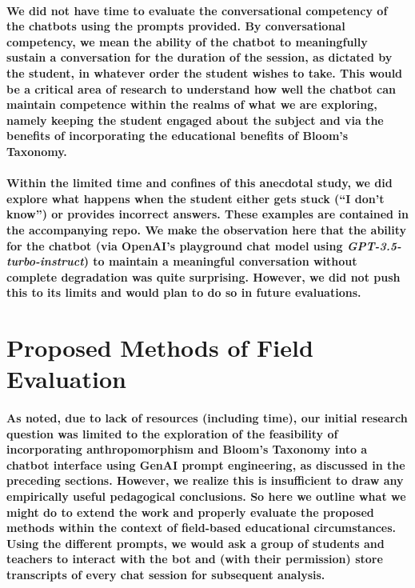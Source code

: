 \documentclass{article}
\begin{document}
\paragraph{We did not have time to evaluate the conversational competency of the chatbots using the prompts provided. By conversational competency, we mean the ability of the chatbot to meaningfully sustain a conversation for the duration of the session, as dictated by the student, in whatever order the student wishes to take. This would be a critical area of research to understand how well the chatbot can maintain competence within the realms of what we are exploring, namely keeping the student engaged about the subject and via the benefits of incorporating the educational benefits of Bloom’s Taxonomy.}

\paragraph{Within the limited time and confines of this anecdotal study, we did explore what happens when the student either gets stuck (“I don’t know”) or provides incorrect answers. These examples are contained in the accompanying repo. We make the observation here that the ability for the chatbot (via OpenAI’s playground chat model using \textit{GPT-3.5-turbo-instruct}) to maintain a meaningful conversation without complete degradation was quite surprising. However, we did not push this to its limits and would plan to do so in future evaluations.}

\section*{Proposed Methods of Field Evaluation}

\paragraph{As noted, due to lack of resources (including time), our initial research question was limited to the exploration of the feasibility of incorporating anthropomorphism and Bloom’s Taxonomy into a chatbot interface using GenAI prompt engineering, as discussed in the preceding sections. However, we realize this is insufficient to draw any empirically useful pedagogical conclusions. So here we outline what we might do to extend the work and properly evaluate the proposed methods within the context of field-based educational circumstances. Using the different prompts, we would ask a group of students and teachers to interact with the bot and (with their permission) store transcripts of every chat session for subsequent analysis.}
\end{document}
